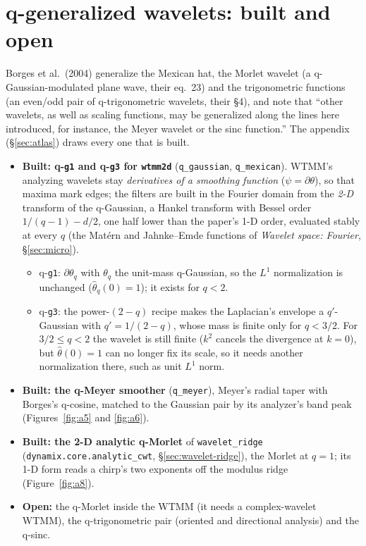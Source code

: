 \documentclass[10pt]{article}
\newcommand{\dev}[1]{\texttt{#1}}
\begin{document}
\section{q-generalized wavelets: built and open}\label{sec:todo}
Borges et al.\ (2004) generalize the Mexican hat, the Morlet wavelet (a q-Gaussian-modulated plane
wave, their eq.~23) and the trigonometric functions (an even/odd pair of q-trigonometric wavelets,
their \S4), and note that ``other wavelets, as well as scaling functions, may be generalized along the
lines here introduced, for instance, the Meyer wavelet or the sinc function.'' The appendix
(\S\ref{sec:atlas}) draws every one that is built.
\begin{itemize}\itemsep2pt
  \item \textbf{Built: q-\texttt{g1} and q-\texttt{g3} for \dev{wtmm2d}} (\texttt{q\_gaussian},
        \texttt{q\_mexican}). WTMM's analyzing wavelets stay \emph{derivatives of a smoothing
        function} ($\psi=\partial\theta$), so that maxima mark edges; the filters are built in the
        Fourier domain from the \emph{2-D} transform of the q-Gaussian, a Hankel transform with Bessel
        order $1/(q-1)-d/2$, one half lower than the paper's 1-D order, evaluated stably at every $q$
        (the Mat\'ern and Jahnke--Emde functions of \emph{Wavelet space: Fourier}, \S\ref{sec:micro}).
        \begin{itemize}\itemsep1pt
          \item q-\texttt{g1}: $\partial\theta_q$ with $\theta_q$ the unit-mass q-Gaussian, so the
                $L^1$ normalization is unchanged ($\hat\theta_q(0)=1$); it exists for $q<2$.
          \item q-\texttt{g3}: the power-$(2-q)$ recipe makes the Laplacian's envelope a
                $q'$-Gaussian with $q'=1/(2-q)$, whose mass is finite only for $q<3/2$. For
                $3/2\le q<2$ the wavelet is still finite ($k^2$ cancels the divergence at
                $k=0$), but $\hat\theta(0)=1$ can no longer fix its scale, so it needs another
                normalization there, such as unit $L^1$ norm.
        \end{itemize}
  \item \textbf{Built: the q-Meyer smoother} (\texttt{q\_meyer}), Meyer's radial taper with Borges's
        q-cosine, matched to the Gaussian pair by its analyzer's band peak (Figures~\ref{fig:a5}
        and \ref{fig:a6}).
  \item \textbf{Built: the 2-D analytic q-Morlet} of \dev{wavelet\_ridge}
        (\texttt{dynamix.core.analytic\_cwt}, \S\ref{sec:wavelet-ridge}), the Morlet at $q=1$; its
        1-D form reads a chirp's two exponents off the modulus ridge (Figure~\ref{fig:a8}).
  \item \textbf{Open:} the q-Morlet inside the WTMM (it needs a complex-wavelet WTMM), the
        q-trigonometric pair (oriented and directional analysis) and the q-sinc.
\end{itemize}
\end{document}
